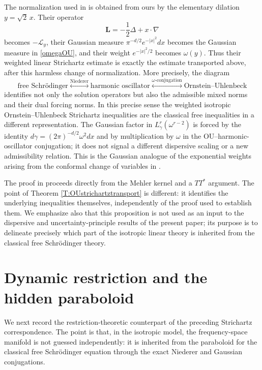 \documentclass[11pt,a4paper]{amsart}
\numberwithin{equation}{section}
\numberwithin{equation}{section}
\begin{document}
The normalization used in \cite{DDLS} is obtained from ours by the elementary dilation $y=\sqrt2\,x$.  Their operator
\[
 \mathbf L=-\frac12\Delta+x\cdot\nabla
\]
becomes $-\mathscr L_y$, their Gaussian measure $\pi^{-d/2}e^{-|x|^2}dx$ becomes the Gaussian measure in \eqref{omegaOU}, and their weight $e^{-|x|^2/2}$ becomes $\omega(y)$.  Thus their weighted linear Strichartz estimate is exactly the estimate transported above, after this harmless change of normalization.  More precisely, the diagram
\[
\text{free Schr\"odinger}
\mathrel{\mathop{\longleftrightarrow}\limits^{\text{Niederer}}}
\text{harmonic oscillator}
\mathrel{\mathop{\longleftrightarrow}\limits^{\omega\text{-conjugation}}}
\text{Ornstein--Uhlenbeck}
\]
identifies not only the solution operators but also the admissible mixed norms and their dual forcing norms.  In this precise sense the weighted isotropic Ornstein--Uhlenbeck Strichartz inequalities are the classical free inequalities in a different representation.  The Gaussian factor in $L^r_\gamma(\omega^{r-2})$ is forced by the identity $d\gamma=(2\pi)^{-d/2}\omega^2dx$ and by multiplication by $\omega$ in the OU--harmonic-oscillator conjugation; it does not signal a different dispersive scaling or a new admissibility relation.  This is the Gaussian analogue of the exponential weights arising from the conformal change of variables in \cite[Section~2]{BGstrich}.

The proof in \cite{DDLS} proceeds directly from the Mehler kernel and a $TT^*$ argument.  The point of Theorem \ref{T:OUstrichartztransport} is different: it identifies the underlying inequalities themselves, independently of the proof used to establish them.  We emphasize also that this proposition is not used as an input to the dispersive and uncertainty-principle results of the present paper; its purpose is to delineate precisely which part of the isotropic linear theory is inherited from the classical free Schr\"odinger theory.






\section{Dynamic restriction and the hidden paraboloid}\label{S:restriction}

We next record the restriction-theoretic counterpart of the preceding Strichartz correspondence.  The point is that, in the isotropic model, the frequency-space manifold is not guessed independently: it is inherited from the paraboloid for the classical free Schr\"odinger equation through the exact Niederer and Gaussian conjugations.
\end{document}
